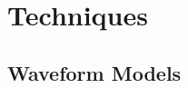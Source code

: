 \documentclass[aps,prd,amsmath,floats,floatfix, twocolumn,
superscriptaddress,nofootinbib,showpacs]{revtex4-1}
\newcommand{\red}{\textcolor{red}}
\begin{document}
\section{Techniques}\label{s1:techniques}



\subsection{Waveform Models}\label{s2:waveforms}

\end{document}
